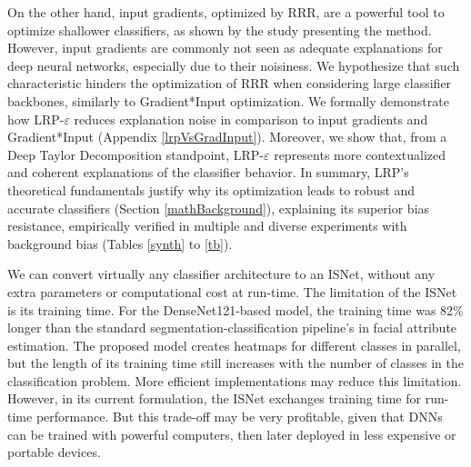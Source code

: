 \documentclass[fleqn,10pt]{wlscirep}
\begin{document}
{On the other hand, input gradients, optimized by RRR, are a powerful tool to optimize shallower classifiers, as shown by the study presenting the method\cite{RRR}. However, input gradients are commonly not seen as adequate explanations for deep neural networks, especially due to their noisiness\cite{LRPvsGrad}. We hypothesize that such characteristic hinders the optimization of RRR when considering large classifier backbones, similarly to Gradient*Input optimization. We formally demonstrate how LRP-$\varepsilon$ reduces explanation noise in comparison to input gradients and Gradient*Input (Appendix \ref{lrpVsGradInput}). Moreover, we show that, from a Deep Taylor Decomposition standpoint, LRP-$\varepsilon$ represents more contextualized and coherent explanations of the classifier behavior. In summary, LRP's theoretical fundamentals justify why its optimization leads to robust and accurate classifiers (Section \ref{mathBackground}), explaining its superior bias resistance, empirically verified in multiple and diverse experiments with background bias (Tables \ref{synth} to \ref{tb}).

We can convert virtually any classifier architecture to an ISNet, without any extra parameters or computational cost at run-time. The limitation of the ISNet is its training time. For the DenseNet121-based model, the training time was 82\% longer than the standard segmentation-classification pipeline's in facial attribute estimation. The proposed model creates heatmaps for different classes in parallel, but the length of its training time still increases with the number of classes in the classification problem. More efficient implementations may reduce this limitation. However, in its current formulation, the ISNet exchanges training time for run-time performance. But this trade-off may be very profitable, given that DNNs can be trained with powerful computers, then later deployed in less expensive or portable devices. 

}
\end{document}
